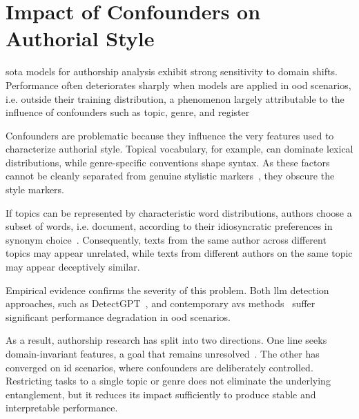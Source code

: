 \section{Impact of Confounders on Authorial Style}
\label{sec:contextual_factors}

\Acl{sota} models for authorship analysis exhibit strong sensitivity to domain shifts. 
Performance often deteriorates sharply when models are applied in \ac{ood} scenarios, i.e. outside their training distribution, a phenomenon largely attributable to the influence of confounders such as topic, genre, and register~\citep{Sundararajan_style_18,bischoff_importance_2020}

Confounders are problematic because they influence the very features used to characterize authorial style. 
Topical vocabulary, for example, can dominate lexical distributions, while genre-specific conventions shape syntax. 
As these factors cannot be cleanly separated from genuine stylistic markers~\citep{bischoff_importance_2020}, they obscure the style markers.

If topics can be represented by characteristic word distributions, authors choose a subset of words, i.e. document, according to their idiosyncratic preferences in synonym choice~\citep{altakrori_topic_2021}. 
Consequently, texts from the same author across different topics may appear unrelated, while texts from different authors on the same topic may appear deceptively similar.

Empirical evidence confirms the severity of this problem.
Both \ac{llm} detection approaches, such as DetectGPT~\citep{mitchell_detectgpt_2023,Wu_ODD_challenges_2025}, and contemporary \acp{av} methods~\citep{Thomas_cross_topic_24} suffer significant performance degradation in \ac{ood} scenarios.

As a result, authorship research has split into two directions. 
One line seeks domain-invariant features, a goal that remains unresolved~\citep{bischoff_importance_2020}. 
The other has converged on \ac{id} scenarios, where confounders are deliberately controlled. 
Restricting tasks to a single topic or genre does not eliminate the underlying entanglement, but it reduces its impact sufficiently to produce stable and interpretable performance.



